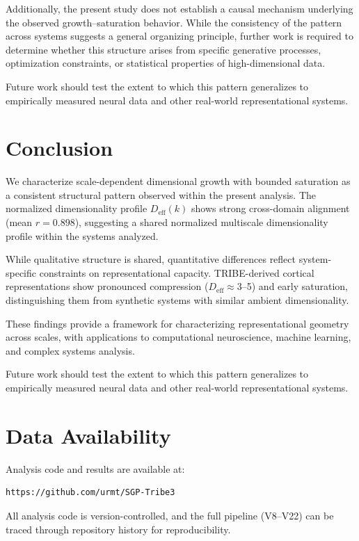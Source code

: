 Additionally, the present study does not establish a causal mechanism underlying the observed growth--saturation behavior. While the consistency of the pattern across systems suggests a general organizing principle, further work is required to determine whether this structure arises from specific generative processes, optimization constraints, or statistical properties of high-dimensional data.

Future work should test the extent to which this pattern generalizes to empirically measured neural data and other real-world representational systems.

\section{Conclusion}

We characterize scale-dependent dimensional growth with bounded saturation as a consistent structural pattern observed within the present analysis. The normalized dimensionality profile $D_{\mathrm{eff}}(k)$ shows strong cross-domain alignment (mean $r = 0.898$), suggesting a shared normalized multiscale dimensionality profile within the systems analyzed.

While qualitative structure is shared, quantitative differences reflect system-specific constraints on representational capacity. TRIBE-derived cortical representations show pronounced compression ($D_{\mathrm{eff}} \approx 3$--5) and early saturation, distinguishing them from synthetic systems with similar ambient dimensionality.

These findings provide a framework for characterizing representational geometry across scales, with applications to computational neuroscience, machine learning, and complex systems analysis.

Future work should test the extent to which this pattern generalizes to empirically measured neural data and other real-world representational systems.

\section*{Data Availability}

Analysis code and results are available at:
\begin{verbatim}
https://github.com/urmt/SGP-Tribe3
\end{verbatim}

All analysis code is version-controlled, and the full pipeline (V8--V22) can be traced through repository history for reproducibility.


